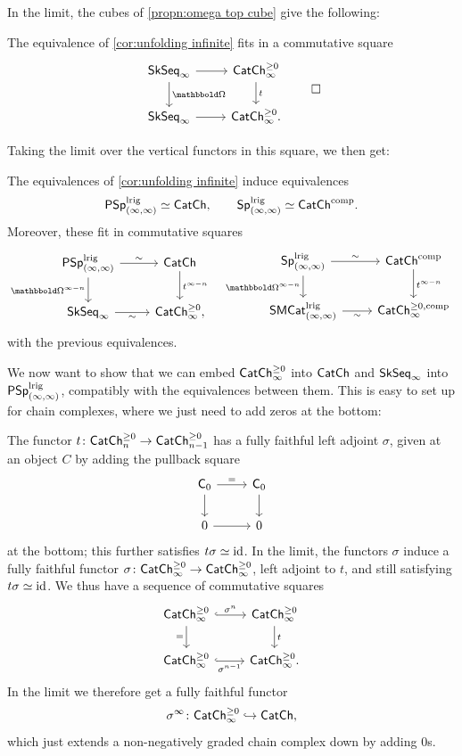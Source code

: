 \documentclass[a4paper,11pt]{article}
\begin{document}
In the limit, the cubes of \cref{propn:omega top cube} give the following:
\begin{cornoproof}
  The equivalence of \cref{cor:unfolding infinite} fits in a
  commutative square
    \[
    \begin{tikzcd}
      \SkSeq_{\infty} \ar[r] \ar[d,
   "\mOm"] & \CChp_{\infty}  \ar[d, "t"] \\
     \SkSeq_{\infty} \ar[r] & \CChp_{\infty}. 
    \end{tikzcd} \qedhere
  \]
\end{cornoproof}


Taking the limit over the vertical functors in this square, we then
get:
\begin{cornoproof}\label{cor:unfolding unbdd}
  The equivalences of \cref{cor:unfolding infinite} induce
  equivalences
  \[ \textup{\textsf{PSp}}_{(\infty,\infty)}^{\text{\textup{lrig}}} \simeq \textup{\textsf{CatCh}}, \qquad \textup{\textsf{Sp}}_{(\infty,\infty)}^{\text{\textup{lrig}}} \simeq \textup{\textsf{CatCh}}^{\text{\textup{comp}}}.\]
  Moreover, these fit in commutative squares
  \[
    \begin{tikzcd}
     \PSpIIl \ar[r, "\sim"] \ar[d, "\mOm^{\infty-n}"'] & \CCh  \ar[d, "t^{\infty-n}"] \\
     \SkSeq_{\infty} \ar[r, "\sim"'] & \CChp_{\infty},
   \end{tikzcd}
   \quad
    \begin{tikzcd}
     \SpIIl \ar[r, "\sim"] \ar[d, "\mOm^{\infty-n}"'] & \CChc  \ar[d, "t^{\infty-n}"] \\
     \SMCatII^{\lrig} \ar[r, "\sim"'] & \CChpc_{\infty}
   \end{tikzcd}   
 \]
 with the previous equivalences.
\end{cornoproof}

We now want to show that we can embed $\textup{\textsf{CatCh}}^{\geq 0}_{\infty}$ into $\textup{\textsf{CatCh}}$ and
$\textup{\textsf{SkSeq}}_{\infty}$ into $\textup{\textsf{PSp}}_{(\infty,\infty)}^{\text{\textup{lrig}}}$, compatibly with the equivalences
between them. This is easy to set up for chain complexes, where we
just need to add zeros at the bottom:
\begin{observation}
  The functor $t \colon \CChp_{n} \to
  \CChp_{n-1}$ has a fully faithful left adjoint $\sigma$, given at an
  object $C$ by adding
  the pullback square
  \[
    \begin{tikzcd}
     \oC_{0} \ar[r, "="] \ar[d] & \oC_{0}  \ar[d] \\
     0 \ar[r] & 0
    \end{tikzcd}
  \]
  at the bottom; this further satisfies $t \sigma \simeq \text{\textup{id}}$. In the
  limit, the functors $\sigma$ induce a fully faithful functor $\sigma \colon
  \CChp_{\infty} \to \CChp_{\infty}$, left adjoint to $t$, and still
  satisfying $t\sigma \simeq \text{\textup{id}}$. We thus have a sequence of
  commutative squares
  \[
    \begin{tikzcd}
     \CChp_{\infty} \ar[r, hookrightarrow, "\sigma^{n}"] \ar[d, "="'] & \CChp_{\infty}  \ar[d, "t"] \\
     \CChp_{\infty} \ar[r, hookrightarrow, "\sigma^{n-1}"'] & \CChp_{\infty}.
    \end{tikzcd}
  \]
  In the limit we therefore get a fully faithful functor
  \[ \sigma^{\infty} \colon \textup{\textsf{CatCh}}^{\geq 0}_{\infty} \hookrightarrow \textup{\textsf{CatCh}},\]
  which just extends a non-negatively graded chain complex down by
  adding $0$s.
\end{observation}
\end{document}
